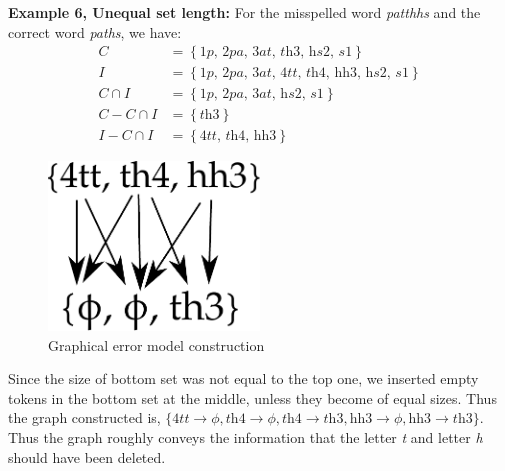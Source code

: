 	\textbf{Example 6, Unequal set length:} For the misspelled word \textit{patthhs} and the correct word \textit{paths}, we have:
	\begin{equation*}
	\begin{aligned}
	C &= \left\lbrace \textit{1p, 2pa, 3at, th3, hs2, s1} \right\rbrace \\
	I &= \left\lbrace \textit{1p, 2pa, 3at, 4tt, th4, hh3, hs2, s1} \right\rbrace \\
	C \cap I &= \left\lbrace \textit{1p, 2pa, 3at, hs2, s1} \right\rbrace \\
	C - C \cap I &= \left\lbrace \textit{th3} \right\rbrace \\
	I - C \cap I &= \left\lbrace \textit{4tt, th4, hh3} \right\rbrace
	\end{aligned}
	\end{equation*}
	\begin{figure}[h]
		\centering
		\includegraphics[width=0.5\textwidth]{gfx/ex7.pdf}
		\caption{Graphical error model construction}
		\label{e6}
	\end{figure}
	
	Since the size of bottom set was not equal to the top one, we inserted empty tokens in the bottom set at the middle, unless they become of equal sizes.
	Thus the graph constructed is, $\lbrace \textit{4tt} \rightarrow  \phi, \textit{th4} \rightarrow  \phi, \textit{th4} \rightarrow  \textit{th3}, \textit{hh3} \rightarrow  \phi,  \textit{hh3} \rightarrow  \textit{th3} \rbrace$.
	Thus the graph roughly conveys the information that the letter \textit{t} and letter \textit{h} should have been deleted.
	
